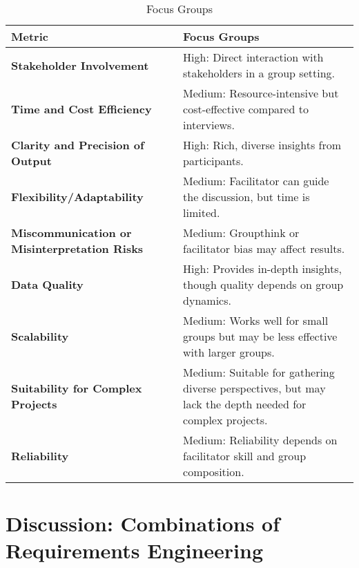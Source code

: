 \documentclass[conference]{IEEEtran}
\begin{document}
\begin{table}[htbp]
\caption{Focus Groups}
\label{tab6}
\centering
\begin{tabular}{|p{4cm}|p{4cm}|}
\hline
\textbf{Metric}                     & \textbf{Focus Groups}                                          \\ \hline
\textbf{Stakeholder Involvement}     & High: Direct interaction with stakeholders in a group setting. \\ \hline
\textbf{Time and Cost Efficiency}    & Medium: Resource-intensive but cost-effective compared to interviews. \\ \hline
\textbf{Clarity and Precision of Output} & High: Rich, diverse insights from participants.              \\ \hline
\textbf{Flexibility/Adaptability}    & Medium: Facilitator can guide the discussion, but time is limited. \\ \hline
\textbf{Miscommunication or Misinterpretation Risks} & Medium: Groupthink or facilitator bias may affect results.     \\ \hline
\textbf{Data Quality}                    & High: Provides in-depth insights, though quality depends on group dynamics. \\ \hline
\textbf{Scalability}                     & Medium: Works well for small groups but may be less effective with larger groups. \\ \hline
\textbf{Suitability for Complex Projects} & Medium: Suitable for gathering diverse perspectives, but may lack the depth needed for complex projects. \\ \hline
\textbf{Reliability}                     & Medium: Reliability depends on facilitator skill and group composition. \\ \hline
\end{tabular}
\end{table}


\section{Discussion: Combinations of Requirements Engineering}
\end{document}
